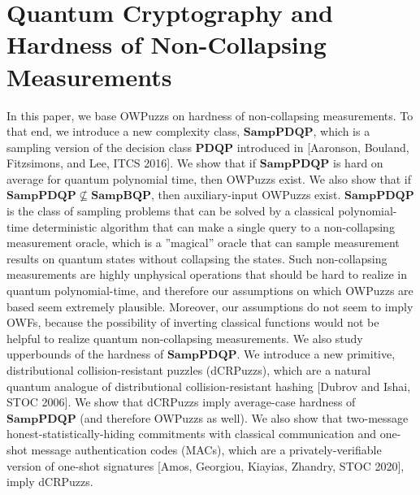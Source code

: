 \documentclass[11pt,oneside]{book}
\theoremstyle{definition}
\theoremstyle{remark}
\theoremstyle{plain}
\begin{document}
\section{\cite{cryptoeprint:2025/1840} Quantum Cryptography and Hardness of Non-Collapsing Measurements}
 In this paper, we base OWPuzzs on hardness of non-collapsing measurements. To that end, we introduce a new complexity class, $\mathbf{SampPDQP}$, which is a sampling version of the decision class $\mathbf{PDQP}$ introduced in [Aaronson, Bouland, Fitzsimons, and Lee, ITCS 2016]. We show that if $\mathbf{SampPDQP}$ is hard on average for quantum polynomial time, then OWPuzzs exist. We also show that if $\mathbf{SampPDQP}\not\subseteq\mathbf{SampBQP}$, then auxiliary-input OWPuzzs exist. $\mathbf{SampPDQP}$ is the class of sampling problems that can be solved by a classical polynomial-time deterministic algorithm that can make a single query to a non-collapsing measurement oracle, which is a ''magical'' oracle that can sample measurement results on quantum states without collapsing the states. Such non-collapsing measurements are highly unphysical operations that should be hard to realize in quantum polynomial-time, and therefore our assumptions on which OWPuzzs are based seem extremely plausible. Moreover, our assumptions do not seem to imply OWFs, because the possibility of inverting classical functions would not be helpful to realize quantum non-collapsing measurements. We also study upperbounds of the hardness of $\mathbf{SampPDQP}$. We introduce a new primitive, distributional collision-resistant puzzles (dCRPuzzs), which are a natural quantum analogue of distributional collision-resistant hashing [Dubrov and Ishai, STOC 2006]. We show that dCRPuzzs imply average-case hardness of $\mathbf{SampPDQP}$ (and therefore OWPuzzs as well). We also show that two-message honest-statistically-hiding commitments with classical communication and one-shot message authentication codes (MACs), which are a privately-verifiable version of one-shot signatures [Amos, Georgiou, Kiayias, Zhandry, STOC 2020], imply dCRPuzzs.
 
\end{document}
